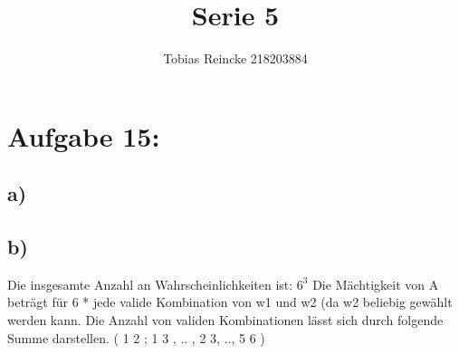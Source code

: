 \documentclass[11pt]{article} %
\title{\color{blue} Serie 5 }
\author{Tobias Reincke 218203884 \\}
\begin{document}
	
\maketitle
\section*{\textbf Aufgabe 15:}
\subsection*{a)}
\subsection*{b)}
Die insgesamte Anzahl an Wahrscheinlichkeiten ist: $6^3$
Die Mächtigkeit von A beträgt für 6 * jede valide Kombination von w1 und w2 (da w2 beliebig gewählt werden kann. Die Anzahl von validen Kombinationen lässt sich durch folgende Summe darstellen. ( 1 2 ; 1 3 , .. , 2 3, .., 5 6 ) \\ \ \\
\end{document}
